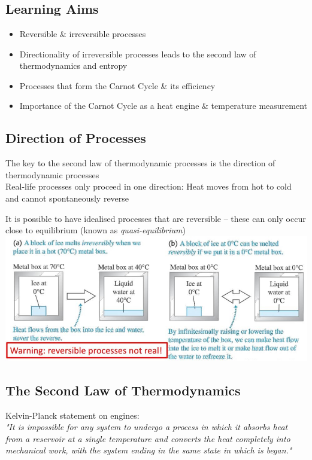 \documentclass[a4paper, 11pt, normalem]{report}
\begin{document}
\chapter{}
\thispagestyle{fancy}
\section{Learning Aims}
\begin{itemize}
	\item Reversible \& irreversible processes
	\item Directionality of irreversible processes leads to the second law of thermodynamics and entropy
	\item Processes that form the Carnot Cycle \& its efficiency
	\item Importance of the Carnot Cycle as a heat engine \& temperature measurement
\end{itemize}

\section{Direction of Processes}
The key to the second law of thermodynamic processes is the direction of thermodynamic processes \\
Real-life processes only proceed in one direction: Heat moves from hot to cold and cannot spontaneously reverse

It is possible to have idealised processes that are reversible -- these can only occur close to equilibrium (known as \emph{quasi-equilibrium}) \\
\includegraphics[scale=0.65]{Icebox.jpg}

\section{The Second Law of Thermodynamics}
Kelvin-Planck statement on engines: \\
\emph{"It is impossible for any system to undergo a process in which it absorbs heat from a reservoir at a single temperature and converts the heat completely into mechanical work, with the system ending in the same state in which is began."}
\end{document}
